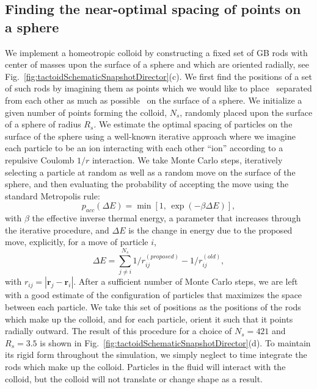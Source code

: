 \documentclass[%
 aip,
 amsmath,amssymb,
 reprint,%
]{revtex4-1}
\begin{document}
\subsection{Finding the near-optimal spacing of points on a sphere} \label{ss:tactoidSpacingPointsOnSphere}
We implement a homeotropic colloid by constructing a fixed set of GB rods with center of masses upon the surface of a sphere and which are oriented radially, see Fig.~\ref{fig:tactoidSchematicSnapshotDirector}(c). We first find the positions of a set of such rods by imagining them as points which we would like to place \textendash\, separated from each other as much as possible \textendash\, on the surface of a sphere. We initialize a given number of points forming the colloid, $N_s$, randomly placed upon the surface of a sphere of radius $R_s$. We estimate the optimal spacing of particles on the surface of the sphere using a well-known iterative approach where we imagine each particle to be an ion interacting with each other ``ion'' according to a repulsive Coulomb $1/r$ interaction. We take Monte Carlo steps, iteratively selecting a particle at random as well as a random move on the surface of the sphere, and then evaluating the probability of accepting the move using the standard Metropolis rule:
\begin{equation}
p_{acc}(\Delta E)=\min\left[1,\,\exp\left(-\beta \Delta E\right)\right],
\end{equation}
with $\beta$ the effective inverse thermal energy, a parameter that increases through the iterative procedure, and $\Delta E$ is the change in energy due to the proposed move, explicitly, for a move of particle $i$,
\begin{equation}
\Delta E = \sum_{j\neq i}^{N_s} 1/r_{ij}^{(proposed)} - 1/r_{ij}^{(old)},
\end{equation}
with $r_{ij} = |\textbf{r}_j-\textbf{r}_i|$. After a sufficient number of Monte Carlo steps, we are left with a good estimate of the configuration of particles that maximizes the space between each particle. We take this set of positions as the positions of the rods which make up the colloid, and for each particle, orient it such that it points radially outward. The result of this procedure for a choice of $N_s=421$ and $R_s=3.5$ is shown in Fig.~\ref{fig:tactoidSchematicSnapshotDirector}(d). To maintain its rigid form throughout the simulation, we simply neglect to time integrate the rods which make up the colloid. Particles in the fluid will interact with the colloid, but the colloid will not translate or change shape as a result.
\end{document}
